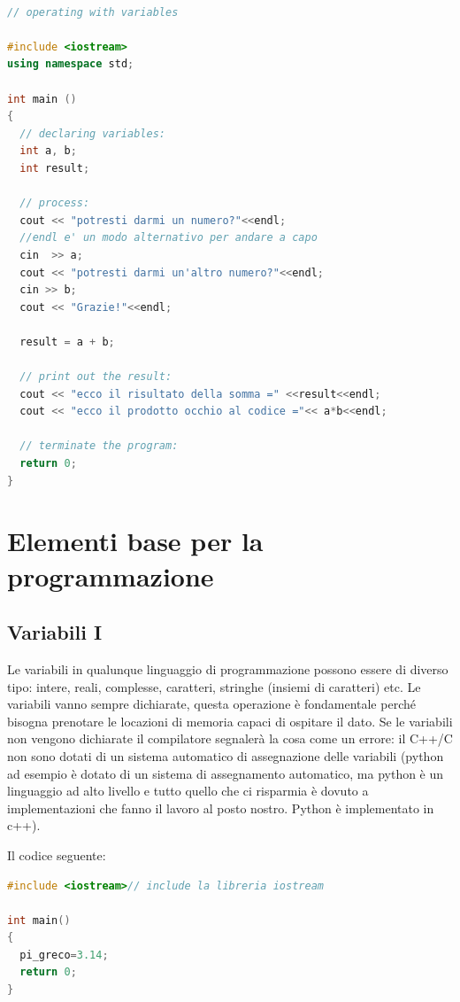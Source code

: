 \documentclass[11pt,fleqn]{book} %
\begin{document}
\begin{lstlisting}[language=c++]

// operating with variables

#include <iostream>
using namespace std;

int main ()
{
  // declaring variables:
  int a, b;
  int result;

  // process:
  cout << "potresti darmi un numero?"<<endl;
  //endl e' un modo alternativo per andare a capo
  cin  >> a;
  cout << "potresti darmi un'altro numero?"<<endl; 
  cin >> b;
  cout << "Grazie!"<<endl;
  
  result = a + b;

  // print out the result:
  cout << "ecco il risultato della somma =" <<result<<endl;
  cout << "ecco il prodotto occhio al codice ="<< a*b<<endl;

  // terminate the program:
  return 0; 
}
\end{lstlisting}

\chapter{Elementi base per la programmazione}

\section{Variabili I}
Le variabili in qualunque linguaggio di programmazione possono essere di diverso tipo: intere, reali, complesse, caratteri, stringhe (insiemi di caratteri) etc. Le variabili vanno sempre dichiarate, questa operazione è fondamentale perché bisogna prenotare le locazioni di memoria capaci di ospitare il dato. Se le variabili non vengono dichiarate il compilatore segnalerà la cosa come un errore: il C++/C non sono dotati di un sistema automatico di assegnazione delle variabili (python ad esempio è dotato di un sistema di assegnamento automatico, ma python è un linguaggio ad alto livello e tutto quello che ci risparmia è dovuto a implementazioni che fanno il lavoro al posto nostro. Python è implementato in c++).

Il codice seguente:\\
\begin{lstlisting}[language=c++]
#include <iostream>// include la libreria iostream

int main()
{
  pi_greco=3.14;
  return 0;
}
\end{lstlisting}
\end{document}
